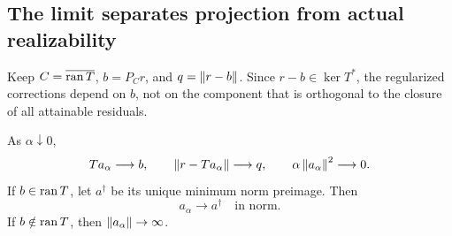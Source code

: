 \subsection{The limit separates projection from actual realizability}
Keep $C=\overline{\operatorname{ran} T}$, $b=P_Cr$, and $q=\left\lVert r-b\right\rVert$. Since $r-b\in\ker T^*$, the regularized corrections depend on $b$, not on the component that is orthogonal to the closure of all attainable residuals.

\begin{theorem}\label{WR08}
As $\alpha\downarrow0$,
\[
 Ta_\alpha\longrightarrow b,\qquad
 \left\lVert r-Ta_\alpha\right\rVert\longrightarrow q,\qquad
 \alpha\left\lVert a_\alpha\right\rVert^2\longrightarrow0.
\]
If $b\in\operatorname{ran} T$, let $a^\dagger$ be its unique minimum norm preimage. Then
\[
 a_\alpha\longrightarrow a^\dagger\quad\text{in norm}.
\]
If $b\notin\operatorname{ran} T$, then $\left\lVert a_\alpha\right\rVert\to\infty$.
\end{theorem}
